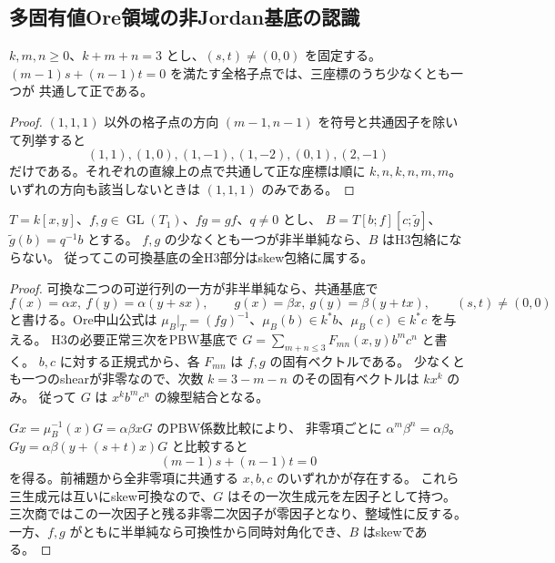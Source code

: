 \subsection{多固有値Ore領域の非Jordan基底の認識}
\label{subsec:cubic-spectral-Ore-reduction}
\begin{lemma}[三次格子の中心を通る直線]\label{lem:cubic-lattice-line}
$k,m,n\ge0$、$k+m+n=3$ とし、$(s,t)\ne(0,0)$ を固定する。
$(m-1)s+(n-1)t=0$ を満たす全格子点では、三座標のうち少なくとも一つが
共通して正である。
\end{lemma}
\begin{proof}
$(1,1,1)$ 以外の格子点の方向 $(m-1,n-1)$ を符号と共通因子を除いて列挙すると
\[
 (1,1),(1,0),(1,-1),(1,-2),(0,1),(2,-1)
\]
だけである。それぞれの直線上の点で共通して正な座標は順に $k,n,k,n,m,m$。
いずれの方向も該当しないときは $(1,1,1)$ のみである。
\end{proof}

\begin{proposition}[可換平面上の非半単純可換作用の排除]
\label{prop:cubic-commuting-Ore-no-shear}
$T=k[x,y]$、$f,g\in\operatorname{GL}(T_1)$、$fg=gf$、$q\ne0$ とし、
$B=T[b;f][c;\widetilde g]$、$\widetilde g(b)=q^{-1}b$ とする。
$f,g$ の少なくとも一つが非半単純なら、$B$ はH3包絡にならない。
従ってこの可換基底の全H3部分はskew包絡に属する。
\end{proposition}
\begin{proof}
可換な二つの可逆行列の一方が非半単純なら、共通基底で
\[
 f(x)=\alpha x,\ f(y)=\alpha(y+s x),\qquad
 g(x)=\beta x,\ g(y)=\beta(y+t x),\qquad(s,t)\ne(0,0)
\]
と書ける。Ore中山公式は
$\mu_B|_T=(fg)^{-1}$、$\mu_B(b)\in k^*b$、$\mu_B(c)\in k^*c$ を与える。
H3の必要正常三次をPBW基底で
$G=\sum_{m+n\le3}F_{mn}(x,y)b^mc^n$ と書く。
$b,c$ に対する正規式から、各 $F_{mn}$ は $f,g$ の固有ベクトルである。
少なくとも一つのshearが非零なので、次数 $k=3-m-n$ のその固有ベクトルは $kx^k$ のみ。
従って $G$ は $x^kb^mc^n$ の線型結合となる。

$Gx=\mu_B^{-1}(x)G=\alpha\beta xG$ のPBW係数比較により、
非零項ごとに $\alpha^m\beta^n=\alpha\beta$。
$Gy=\alpha\beta(y+(s+t)x)G$ と比較すると
\[
 (m-1)s+(n-1)t=0
\]
を得る。前補題から全非零項に共通する $x,b,c$ のいずれかが存在する。
これら三生成元は互いにskew可換なので、$G$ はその一次生成元を左因子として持つ。
三次商ではこの一次因子と残る非零二次因子が零因子となり、整域性に反する。
一方、$f,g$ がともに半単純なら可換性から同時対角化でき、$B$ はskewである。
\end{proof}

